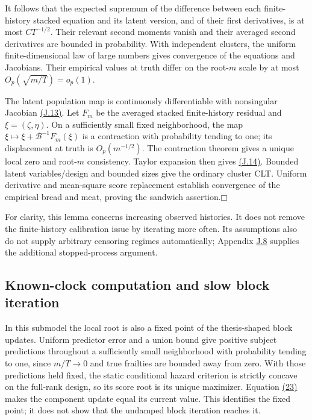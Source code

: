 \documentclass[11pt]{article}
\providecommand{\square}{\mdlgwhtsquare}
\begin{document}
It follows that the expected supremum of the difference between each finite-history stacked equation and its latent version, and of their first derivatives, is at most \(CT^{-1/2}\). Their relevant second moments vanish and their averaged second derivatives are bounded in probability. With independent clusters, the uniform finite-dimensional law of large numbers gives convergence of the equations and Jacobians. Their empirical values at truth differ on the root-\(m\) scale by at most \(O_p(\sqrt{m/T})=o_p(1)\).

The latent population map is continuously differentiable with nonsingular Jacobian \hyperref[eq:J.13]{(J.13)}. Let \(F_m\) be the averaged stacked finite-history residual and \(\xi=(\zeta,\eta)\). On a sufficiently small fixed neighborhood, the map \(\xi\mapsto\xi+\mathcal B^{-1}F_m(\xi)\) is a contraction with probability tending to one; its displacement at truth is \(O_p(m^{-1/2})\). The contraction theorem gives a unique local zero and root-\(m\) consistency. Taylor expansion then gives \hyperref[eq:J.14]{(J.14)}. Bounded latent variables/design and bounded sizes give the ordinary cluster CLT. Uniform derivative and mean-square score replacement establish convergence of the empirical bread and meat, proving the sandwich assertion.\hfill$\square$

For clarity, this lemma concerns increasing observed histories. It does not remove the finite-history calibration issue by iterating more often. Its assumptions also do not supply arbitrary censoring regimes automatically; Appendix \hyperref[sec:J.8]{J.8} supplies the additional stopped-process argument.

\subsection{Known-clock computation and slow block iteration}\label{sec:J.4}

In this submodel the local root is also a fixed point of the thesis-shaped block updates. Uniform predictor error and a union bound give positive subject predictions throughout a sufficiently small neighborhood with probability tending to one, since \(m/T\to0\) and true frailties are bounded away from zero. With those predictions held fixed, the static conditional hazard criterion is strictly concave on the full-rank design, so its score root is its unique maximizer. Equation \hyperref[eq:23]{(23)} makes the component update equal its current value. This identifies the fixed point; it does not show that the undamped block iteration reaches it.
\end{document}
